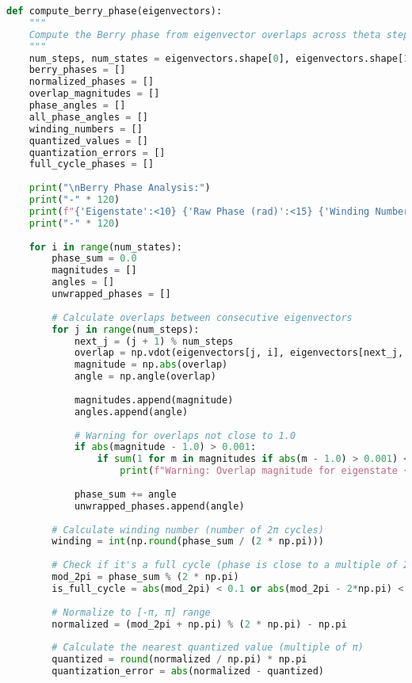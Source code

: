 \documentclass{article}
\begin{document}
\begin{lstlisting}[language=Python, caption=Computing the Berry phase]
def compute_berry_phase(eigenvectors):
    """
    Compute the Berry phase from eigenvector overlaps across theta steps.
    """
    num_steps, num_states = eigenvectors.shape[0], eigenvectors.shape[1]
    berry_phases = []
    normalized_phases = []
    overlap_magnitudes = []
    phase_angles = []
    all_phase_angles = []
    winding_numbers = []
    quantized_values = []
    quantization_errors = []
    full_cycle_phases = []
    
    print("\nBerry Phase Analysis:")
    print("-" * 120)
    print(f"{'Eigenstate':<10} {'Raw Phase (rad)':<15} {'Winding Number':<15} {'Mod 2π Phase':<15} {'Normalized':<15} {'Quantized':<15} {'Error':<10} {'Full Cycle':<15}")
    print("-" * 120)
    
    for i in range(num_states):
        phase_sum = 0.0
        magnitudes = []
        angles = []
        unwrapped_phases = []
        
        # Calculate overlaps between consecutive eigenvectors
        for j in range(num_steps):
            next_j = (j + 1) % num_steps
            overlap = np.vdot(eigenvectors[j, i], eigenvectors[next_j, i])
            magnitude = np.abs(overlap)
            angle = np.angle(overlap)
            
            magnitudes.append(magnitude)
            angles.append(angle)
            
            # Warning for overlaps not close to 1.0
            if abs(magnitude - 1.0) > 0.001:
                if sum(1 for m in magnitudes if abs(m - 1.0) > 0.001) <= 20:
                    print(f"Warning: Overlap magnitude for eigenstate {i} at step {j} is {magnitude:.6f}, not close to 1.0")
            
            phase_sum += angle
            unwrapped_phases.append(angle)
        
        # Calculate winding number (number of 2π cycles)
        winding = int(np.round(phase_sum / (2 * np.pi)))
        
        # Check if it's a full cycle (phase is close to a multiple of 2π)
        mod_2pi = phase_sum % (2 * np.pi)
        is_full_cycle = abs(mod_2pi) < 0.1 or abs(mod_2pi - 2*np.pi) < 0.1
        
        # Normalize to [-π, π] range
        normalized = (mod_2pi + np.pi) % (2 * np.pi) - np.pi
        
        # Calculate the nearest quantized value (multiple of π)
        quantized = round(normalized / np.pi) * np.pi
        quantization_error = abs(normalized - quantized)
        

\end{lstlisting}
\end{document}
